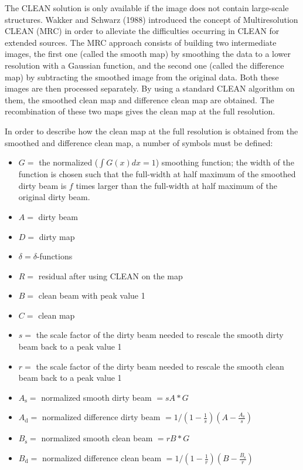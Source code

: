 The CLEAN solution is only available if the image does not contain
large-scale structures.  Wakker and Schwarz (1988)
introduced the concept of Multiresolution CLEAN
(MRC) in order to alleviate the difficulties occurring
in CLEAN for extended sources.  The MRC approach
consists of building two intermediate images, the first one (called
the smooth map) by smoothing the data to a lower resolution with a
Gaussian function, and the second one (called the difference map)
by subtracting the smoothed image from the original data.  Both
these images are then processed separately.  By using a standard
CLEAN algorithm on them, the smoothed clean map and difference clean map are
obtained.  The recombination of these two maps gives the clean map
at the full resolution.

In order to describe how the clean map at the full resolution is
obtained from the smoothed and difference clean map, a number of symbols
must be defined:
\begin{itemize}
\item $G = $ the normalized  ($\int G(x)dx = 1$) smoothing function; the width
of the function is chosen such that the 
full-width at half maximum of the smoothed dirty beam is $f$
times larger than the full-width at half maximum of the original dirty beam.
\item $A = $ dirty beam
\item $D = $ dirty map
\item $\delta = \delta$-functions
\item $R = $ residual after using CLEAN on the map
\item $B = $ clean beam with peak value 1
\item $C = $ clean map 
\item $s = $ the scale factor of the dirty beam needed to rescale the smooth  dirty beam back to a peak value 1
\item $r = $ the scale factor of the dirty beam needed to rescale the smooth clean beam back to a peak value 1 
\item $A_{\mbox{s}} = $ normalized smooth dirty beam  $= s A * G$
\item $A_{\mbox{d}} = $ normalized difference dirty beam 
$= 1/(1-\frac{1}{s})(A-\frac{A_{\mbox{s}}}{s})$
\item $B_{\mbox{s}} = $ normalized smooth clean beam $= r B * G$
\item $B_{\mbox{d}} = $ normalized difference clean beam  
$= 1/(1-\frac{1}{r})(B-\frac{B_{\mbox{s}}}{r})$
\end{itemize}


